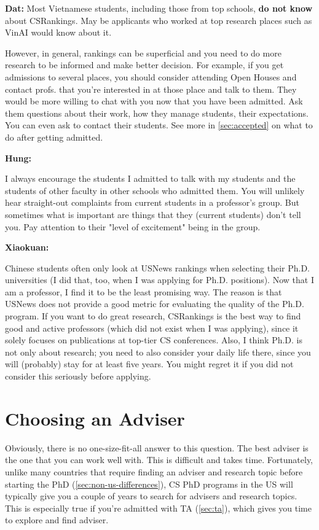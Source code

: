 \documentclass[oneside,11pt]{memoir}
\newenvironment{commentbox}[1][]{
  \small
  \begin{mybox}
    {\small \textbf{#1}}
  }{
  \end{mybox}
}
\begin{document}
\begin{commentbox}[Dat:] Most Vietnamese students, including those from top schools, \textbf{do not know} about CSRankings.  May be applicants who worked at top research places such as VinAI would know about it.
\end{commentbox}

However, in general, rankings can be superficial and you need to do more research to be informed and make better decision. For example, if you get admissions to several places, you should consider attending Open Houses and contact profs. that you're interested in at those place and talk to them. They would be more willing to chat with you now that you have been admitted.  Ask them questions about their work, how they manage students, their expectations. You can even ask to contact their students. See more in \autoref{sec:accepted} on what to do after getting admitted.


\begin{commentbox}[Hung:]
  I always encourage the students I admitted to talk with my students and the students of other faculty in other schools who admitted them. You will unlikely hear straight-out complaints from current students in a professor’s group. But sometimes what is important are things that they (current students) don’t tell you. Pay attention to their "level of excitement" being in the group.
\end{commentbox}

\begin{commentbox}[Xiaokuan:]
  Chinese students often only look at USNews rankings when selecting their Ph.D. universities (I did that, too, when I was applying for Ph.D. positions).
  Now that I am a professor, I find it to be the least promising way.
  The reason is that USNews does not provide a good metric for evaluating the quality of the Ph.D. program.
  If you want to do great research, CSRankings is the best way to find good and active professors (which did not exist when I was applying),
  since it solely focuses on publications at top-tier CS conferences.
  Also,
  I think Ph.D. is not only about research;
  you need to also consider your daily life there, since you will (probably) stay for at least five years.
  You might regret it if you did not consider this seriously before applying.
\end{commentbox}

\section{Choosing an Adviser}
Obviously, there is no one-size-fit-all answer to this question. The best adviser is the one that you can work well with.  This is difficult and takes time. Fortunately, unlike many countries that require finding an adviser and research topic before starting the PhD (\autoref{sec:non-us-differences}), CS PhD programs in the US will typically give you a couple of years to search for advisers and research topics.  This is especially true if you're admitted with TA (\autoref{sec:ta}), which gives you time to explore and find adviser.
\end{document}
